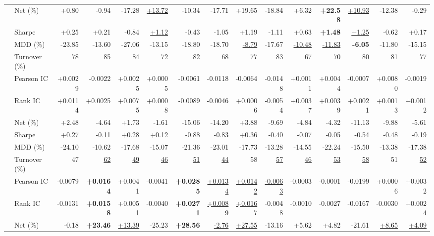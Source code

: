 \begin{table}[t]
{\begin{tabular}{llrrrrrrrrrrrrr}
 & Net (\%)     & +0.80 & -0.94 & -17.28 & \underline{+13.72} & -10.34 & -17.71 & +19.65 & -18.84 & +6.32 & \textbf{+22.58} & \underline{+10.93} & -12.38 & -0.29 \\
 & Sharpe       & +0.25 & +0.21 & -0.84 & \underline{+1.12} & -0.43 & -1.05 & +1.19 & -1.11 & +0.63 & \textbf{+1.48} & \underline{+1.25} & -0.62 & +0.17 \\
 & MDD (\%)     & -23.85 & -13.60 & -27.06 & -13.15 & -18.80 & -18.70 & \underline{-8.79} & -17.67 & \underline{-10.48} & \underline{-11.83} & \textbf{-6.05} & -11.80 & -15.15 \\
 & Turnover (\%)& 78 & 85 & 84 & 72 & 82 & 68 & 77 & 83 & 67 & 70 & 80 & 81 & 77 \\
\addlinespace
\multirow{6}{*}{DeformT. $67{,}449$}
 & Pearson IC   & +0.0029 & -0.0022 & +0.0025 & +0.0005 & -0.0061 & -0.0118 & -0.0064 & -0.0148 & +0.0011 & +0.0044 & -0.0007 & +0.0080 & -0.0019 \\
 & Rank IC      & +0.0114 & +0.0025 & +0.0075 & +0.0008 & -0.0089 & -0.0046 & +0.0006 & -0.0054 & +0.0037 & +0.0039 & +0.0021 & +0.0013 & +0.0012 \\
 & Net (\%)     & +2.48 & -4.64 & +1.73 & -1.61 & -15.06 & -14.20 & +3.88 & -9.69 & -4.84 & -4.32 & -11.13 & -9.88 & -5.61 \\
 & Sharpe       & +0.27 & -0.11 & +0.28 & +0.12 & -0.88 & -0.83 & +0.36 & -0.40 & -0.07 & -0.05 & -0.54 & -0.48 & -0.19 \\
 & MDD (\%)     & -24.10 & -10.62 & -17.68 & -15.07 & -21.36 & -23.01 & -17.73 & -13.28 & -14.55 & -22.24 & -15.50 & -13.38 & -17.38 \\
 & Turnover (\%)& 47 & \underline{62} & \underline{49} & \underline{46} & \underline{51} & \underline{44} & 58 & \underline{57} & \underline{46} & \underline{53} & \underline{58} & 51 & \underline{52} \\
\addlinespace
\multirow{6}{*}{TimeMixer $72{,}997$}
 & Pearson IC   & -0.0079 & \textbf{+0.0164} & +0.0041 & -0.0041 & \textbf{+0.0285} & \underline{+0.0134} & \underline{+0.0142} & \underline{-0.0063} & -0.0003 & -0.0001 & -0.0199 & +0.0006 & +0.0032 \\
 & Rank IC      & -0.0131 & \textbf{+0.0158} & +0.0051 & -0.0040 & \textbf{+0.0271} & \underline{+0.0089} & \underline{+0.0167} & -0.0048 & -0.0010 & -0.0027 & -0.0167 & -0.0030 & +0.0024 \\
 & Net (\%)     & -0.18 & \textbf{+23.46} & \underline{+13.39} & -25.23 & \textbf{+28.56} & \underline{-2.76} & \underline{+27.55} & -13.16 & +5.62 & +4.82 & -21.61 & \underline{+8.65} & \underline{+4.09} \\

\end{tabular}}
\end{table}
